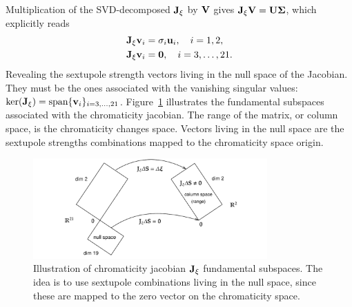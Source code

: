 Multiplication of the SVD-decomposed $\vb{J}_{\xi}$ by $\vb{V}$ gives $\vb{J}_{\xi}\vb{V} = \vb{U}\boldsymbol{\Sigma}$, which explicitly reads
\begin{equation}
    \begin{aligned}
        \vb{J}_{\xi}\vb{v}_i & = \sigma_i \vb{u}_i, \quad i=1,2,\\
        \vb{J}_{\xi}\vb{v}_i & = \vb{0}, \quad i=3,\dots,21.\\
    \end{aligned}
\end{equation}
Revealing the sextupole strength vectors living in the null space of the Jacobian. They must be the ones associated with the vanishing singular values: $\text{ker}(\vb{J}_\xi) = \text{span}\{\vb{v}_i\}_{i=3,\dots,21}$.
Figure~\ref{fig:chrom_jac_subspaces} illustrates the fundamental subspaces associated with the chromaticity jacobian. The range of the matrix, or column space, is the chromaticity changes space. Vectors living in the null space are the sextupole strengths combinations mapped to the chromaticity space origin.

\begin{figure}
    \centering
    \includegraphics[width=0.8\textwidth]{Images/chrom_jacobian_subspaces.pdf}
    \caption[Illustration of chromaticity jacobian $\vb{J}_{\xi}$ fundamental subspaces]{Illustration of chromaticity jacobian $\vb{J}_{\xi}$ fundamental subspaces. The idea is to use sextupole combinations living in the null space, since these are mapped to the zero vector on the chromaticity space.}
    \label{fig:chrom_jac_subspaces}
\end{figure}

